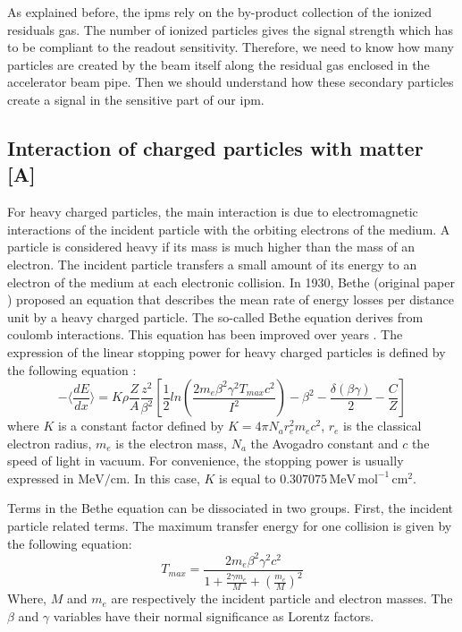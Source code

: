 \begin{refsection}
  As explained before, the \acrshort{ipm}s rely on the by-product collection of the ionized residuals gas. The number of ionized particles gives the signal strength which has to be compliant to the readout sensitivity. Therefore, we need to know how many particles are created by the beam itself along the residual gas enclosed in the accelerator beam pipe. Then we should understand how these secondary particles create a signal in the sensitive part of our \acrshort{ipm}.


  \subsection{Interaction of charged particles with matter [A]}
  For heavy charged particles, the main interaction is due to electromagnetic interactions of the incident particle with the orbiting electrons of the medium. A particle is considered heavy if its mass is much higher than the mass of an electron. The incident particle transfers a small amount of its energy to an electron of the medium at each electronic collision. In 1930, Bethe (original paper \cite{Bethe1930}) proposed an equation that describes the mean rate of energy losses per distance unit by a heavy charged particle. The so-called Bethe equation derives from coulomb interactions. This equation has been improved over years \cite{Fermi1940,Fano1963}. The expression of the linear stopping power for heavy charged particles is defined by the following equation \cite[p. 446]{Tanabashi2018}:
  \begin{equation}
    - \bigg \langle \frac{dE}{dx} \bigg \rangle =K \rho \frac{Z}{A} \frac{z^{2}}{\beta^{2}} \left[\frac{1}{2} ln \left(\frac{2 m_{e} \beta^{2} \gamma^{2} T_{max}c^{2}}{I^{2}} \right) - \beta^{2} - \frac{\delta(\beta \gamma)}{2} - \frac{C}{Z} \right]
  \end{equation}
  where \(K\) is a constant factor defined by \(K=4 \pi N_{a} r_{e}^{2} m_{e} c^{2}\), \(r_{e}\) is the classical electron radius, \(m_{e}\) is the electron mass, \(N_{a}\) the Avogadro constant and $c$ the speed of light in vacuum. For convenience, the stopping power is usually expressed in \(\mathrm{MeV/cm}\). In this case, \(K\) is equal to \(0.307075\,\mathrm{MeV \, mol^{-1} \, cm^{2}}\).

  Terms in the Bethe equation can be dissociated in two groups. First, the incident particle related terms. The maximum transfer energy for one collision is given by the following equation:
  \begin{equation}
    T_{max} = \frac{2 m_{e} \beta^{2} \gamma^{2} c^{2}}{1 + \frac{2 \gamma m_{e} }{M} + \left( \frac{m_{e}}{M} \right)^{2}}
  \end{equation}
  Where, \(M\) and \(m_{e}\) are respectively the incident particle and electron masses. The \(\beta\) and \(\gamma\) variables have their normal significance as Lorentz factors.


\end{refsection}
